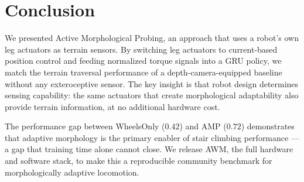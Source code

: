 \documentclass{article}
\newcommand{\todo}[1]{\textcolor{red}{[TODO: #1]}}
\begin{document}

\section{Conclusion}

We presented Active Morphological Probing, an approach that uses a robot's own leg
actuators as terrain sensors. By switching leg actuators to current-based position control
and feeding normalized torque signals into a GRU policy, we match the terrain traversal
performance of a depth-camera-equipped baseline without any exteroceptive sensor. The
key insight is that robot design determines sensing capability: the same actuators that
create morphological adaptability also provide terrain information, at no additional
hardware cost.

The performance gap between WheelsOnly ($0.42$) and AMP ($0.72$) demonstrates that
adaptive morphology is the primary enabler of stair climbing performance --- a gap that
training time alone cannot close. We release AWM, the full hardware and software stack,
to make this a reproducible community benchmark for morphologically adaptive locomotion.


\clearpage
\acknowledgments{\todo{Add acknowledgments for camera-ready version.}}


\end{document}
